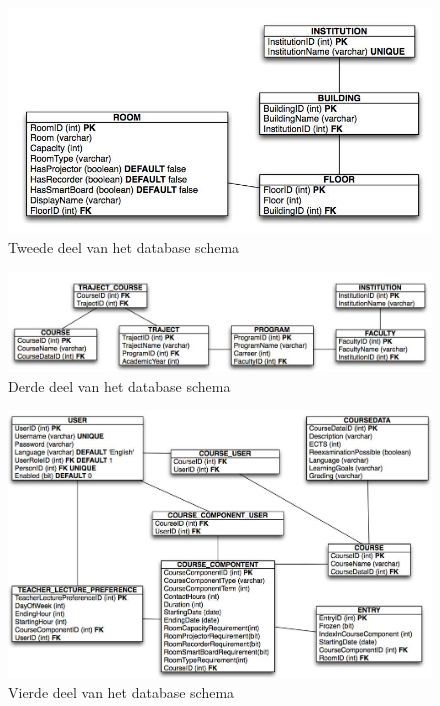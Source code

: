 \begin{figure}[H]
	\centering
	\includegraphics[scale=0.4]{design/EER/design2}
	\caption{Tweede deel van het database schema}
	\label{fig:db2}
\end{figure}

\begin{figure}[H]
	\centering
	\includegraphics[scale=0.4]{design/EER/design3}
	\caption{Derde deel van het database schema}
	\label{fig:db3}
\end{figure}

\begin{figure}[H]
	\centering
	\includegraphics[scale=0.4]{design/EER/design4}
	\caption{Vierde deel van het database schema}
	\label{fig:db4}
\end{figure}